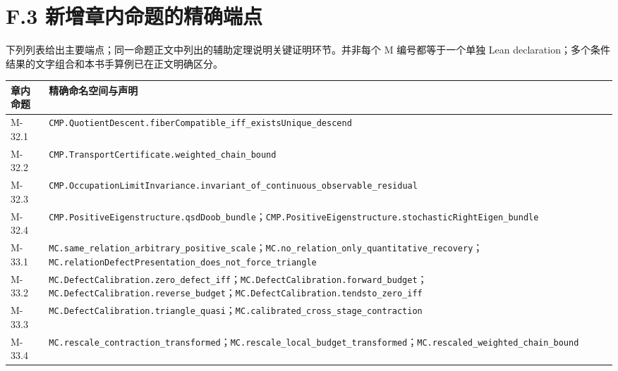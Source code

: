 \documentclass[
  11pt,
  oneside]{book}
\newcounter{none} %
\begin{document}
\section{F.3 新增章内命题的精确端点}\label{f.3-ux65b0ux589eux7ae0ux5185ux547dux9898ux7684ux7cbeux786eux7aefux70b9}

下列列表给出主要端点；同一命题正文中列出的辅助定理说明关键证明环节。并非每个 M 编号都等于一个单独 Lean declaration；多个条件结果的文字组合和本书手算例已在正文明确区分。

{\def\LTcaptype{none} %
\begin{longtable}[]{@{}
  >{\raggedright\arraybackslash}p{}
  >{\raggedright\arraybackslash}p{}@{}}
\toprule\noalign{}
\begin{minipage}[b]{\linewidth}\raggedright
章内命题
\end{minipage} & \begin{minipage}[b]{\linewidth}\raggedright
精确命名空间与声明
\end{minipage} \\
\midrule\noalign{}
\endhead
\bottomrule\noalign{}
\endlastfoot
M-32.1 & \nolinkurl{CMP.QuotientDescent.fiberCompatible_iff_existsUnique_descend} \\
M-32.2 & \nolinkurl{CMP.TransportCertificate.weighted_chain_bound} \\
M-32.3 & \nolinkurl{CMP.OccupationLimitInvariance.invariant_of_continuous_observable_residual} \\
M-32.4 & \nolinkurl{CMP.PositiveEigenstructure.qsdDoob_bundle}；\nolinkurl{CMP.PositiveEigenstructure.stochasticRightEigen_bundle} \\
M-33.1 & \nolinkurl{MC.same_relation_arbitrary_positive_scale}；\nolinkurl{MC.no_relation_only_quantitative_recovery}；\nolinkurl{MC.relationDefectPresentation_does_not_force_triangle} \\
M-33.2 & \nolinkurl{MC.DefectCalibration.zero_defect_iff}；\nolinkurl{MC.DefectCalibration.forward_budget}；\nolinkurl{MC.DefectCalibration.reverse_budget}；\nolinkurl{MC.DefectCalibration.tendsto_zero_iff} \\
M-33.3 & \nolinkurl{MC.DefectCalibration.triangle_quasi}；\nolinkurl{MC.calibrated_cross_stage_contraction} \\
M-33.4 & \nolinkurl{MC.rescale_contraction_transformed}；\nolinkurl{MC.rescale_local_budget_transformed}；\nolinkurl{MC.rescaled_weighted_chain_bound} \\

\end{longtable}}
\end{document}
